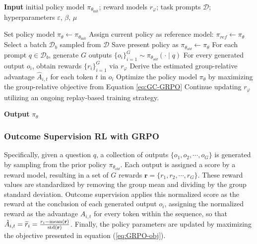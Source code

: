 \begin{algorithm}[t]
  \small
  \caption{Iterative Group Relative Policy Optimization}
  \textbf{Input} initial policy model $\pi_{\theta_{\text{init}}}$; reward models $r_\varphi$; task prompts $\mathcal{D}$; 
  hyperparameters $\varepsilon$, $\beta$, $\mu$
  \begin{algorithmic}[1]
    \State Set policy model $\pi_\theta \leftarrow \pi_{\theta_{\text{init}}}$
       \State Assign current policy as reference model: $\pi_{ref} \leftarrow \pi_{\theta}$
      \State Select a batch $\mathcal{D}_b$ sampled from $\mathcal{D}$
      \State Save present policy as $\pi_{\theta_{old}} \leftarrow \pi_{\theta}$ 
      \State For each prompt $q \in \mathcal{D}_b$, generate $G$ outputs $\{o_i\}_{i=1}^G \sim \pi_{\theta_{old}} (\cdot \mid q)$ 
      \State For every generated output $o_i$, obtain rewards $\{r_i\}_{i=1}^{G}$ via $r_\varphi$
      \State Derive the estimated group-relative advantage $\hat{A}_{i,t}$ for each token $t$ in $o_i$
        \State Optimize the policy model $\pi_{\theta}$ by maximizing the group-relative objective from Equation \ref{eq:GC-GRPO}
      \EndFor
    \EndFor \State Continue updating $r_\varphi$ utilizing an ongoing replay-based training strategy.
    \EndFor 
  \end{algorithmic}
  \textbf{Output} $\pi_\theta$
  \label{alg:iter-grpo}
\end{algorithm}

\subsubsection{Outcome Supervision RL with GRPO} Specifically, given a question $q$, a collection of outputs $\{o_1, o_2, \cdots, o_G\}$ is generated by sampling from the prior policy $\pi_{\theta_{old}}$. Each output is assigned a score by a reward model, resulting in a set of $G$ rewards $\mathbf{r}=\{r_1, r_2, \cdots, r_G\}$. These reward values are standardized by removing the group mean and dividing by the group standard deviation. Outcome supervision applies this normalized score as the reward at the conclusion of each generated output $o_i$, assigning the normalized reward as the advantage $\hat{A}_{i, t}$ for every token within the sequence, so that $\hat{A}_{i, t} = \widetilde{r}_i = \frac{r_i- {\rm mean}(\mathbf{r})}{{\rm std}(\mathbf{r})}$. Finally, the policy parameters are updated by maximizing the objective presented in equation (\ref{eq:GRPO-obj}).

